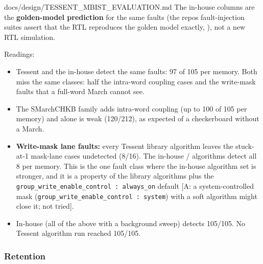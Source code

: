 \begin{relocated}{docs/design/TESSENT_MBIST_EVALUATION.md}
The in-house columns are the \textbf{golden-model prediction} for the
same faults (the repo\textquotesingle s fault-injection suites assert
that the RTL reproduces the golden model exactly,
), not a new RTL simulation.

Readings:

\begin{itemize}
\tightlist
\item
  Tessent  and the in-house  detect
  the same faults: 97 of 105 per memory. Both miss the same classes:
  half the intra-word coupling cases and the write-mask faults that a
  full-word March cannot see.
\item
  The SMarchCHKB family adds intra-word coupling (up to 100 of 105 per
  memory) and  alone is weak
  (120/\allowbreak{}212), as expected of a checkerboard without a March.
\item
  \textbf{Write-mask lane faults:} every Tessent library algorithm
  leaves the stuck-at-1 mask-lane cases undetected (8/16). The in-house
  / algorithms detect all 8 per memory. This is
  the one fault class where the in-house algorithm set is stronger, and
  it is a property of the library algorithms plus the
  \texttt{group\_\allowbreak{}write\_\allowbreak{}enable\_\allowbreak{}control\ :\allowbreak{}\ always\_\allowbreak{}on}
  default {[}A: a system-controlled mask
  (\texttt{group\_\allowbreak{}write\_\allowbreak{}enable\_\allowbreak{}control\ :\allowbreak{}\ system})
  with a soft algorithm might close it; not tried{]}.
\item
  In-house  (all of the above with a background sweep)
  detects 105/105. No Tessent algorithm run reached 105/105.
\end{itemize}

\subsubsection{Retention}\label{tm:dec:tessent-mbist-evaluation:53-retention}

{\footnotesize\setlength{\tabcolsep}{3pt}

}
\end{relocated}
